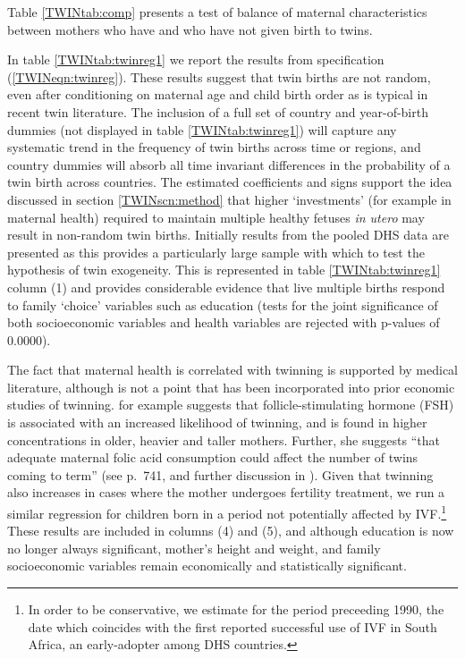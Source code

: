Table \ref{TWINtab:comp} presents a test of balance of maternal characteristics
between mothers who have and who have not given birth to twins.

In table \ref{TWINtab:twinreg1} we report the results from specification 
(\ref{TWINeqn:twinreg}). These results suggest that twin births are 
not random, even after conditioning on maternal age and child birth order as is
typical in recent twin literature. The inclusion of a full set of country and 
year-of-birth dummies (not displayed in table \ref{TWINtab:twinreg1}) will 
capture any systematic trend in the frequency of twin births across time or 
regions, and country dummies will absorb all time invariant differences in the 
probability of a twin birth across countries.  The estimated coefficients and 
signs support the idea discussed in section \ref{TWINscn:method} that higher 
`investments' (for example in maternal health) required to maintain multiple 
healthy fetuses \emph{in utero} may result in non-random twin births. Initially 
results from the pooled DHS data are presented as this provides a particularly 
large sample with which to test the hypothesis of twin exogeneity.  This is 
represented in table \ref{TWINtab:twinreg1} column (1) and provides considerable 
evidence that live multiple births respond to family `choice' variables such as 
education (tests for the joint significance of both socioeconomic variables and 
health variables are rejected with p-values of 0.0000).


The fact that maternal health is correlated with twinning is supported by medical 
literature, although is not a point that has been incorporated into prior 
economic studies of twinning.  \citet{Hall2003} for example suggests that 
follicle-stimulating hormone (FSH) is associated with an increased likelihood 
of twinning, and is found in higher concentrations in older, heavier and taller 
mothers.  Further, she suggests ``that adequate maternal folic acid consumption 
could affect the number of twins coming to term'' (see p.\ 741, and further 
discussion in \citet{Lietal2003}).  Given that twinning also increases in cases 
where the mother undergoes fertility treatment, we run a similar regression for 
children born in a period not potentially affected by IVF.\footnote{In order to 
be conservative, we estimate for the period preceeding 1990, the date which 
coincides with the first reported successful use of IVF in South Africa, an 
early-adopter among DHS countries.}  These results are included in columns (4) 
and (5), and although education is now no longer always significant, mother's 
height and weight, and family socioeconomic variables remain economically and 
statistically significant.

